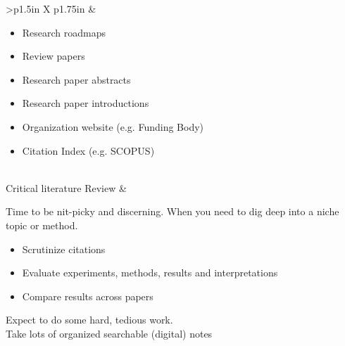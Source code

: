 \documentclass[8pt]{extarticle}
\begin{document}
\begin{tabularx}{\linewidth}{>{\bfseries}p{1.5in} X p{1.75in}}
                                                            &   \begin{minipage}[t]{\linewidth}
                                                                \begin{itemize}[nosep,leftmargin=*]
                                                                    \item Research roadmaps
                                                                    \item Review papers
                                                                    \item Research paper abstracts
                                                                    \item Research paper introductions
                                                                \end{itemize}
                                                                \vspace{1em}
                                                                \begin{itemize}[nosep,leftmargin=*]
                                                                    \item Organization website (e.g. Funding Body)
                                                                    \item Citation Index (e.g. SCOPUS)
                                                                \end{itemize}
                                                                \end{minipage}
                                                                        \\
    \addlinespace
    Critical literature Review  &   \begin{minipage}[t]{\linewidth}
                                    Time to be nit-picky and discerning.
                                    When you need to dig deep into a niche topic or method.
                                    \begin{itemize}[nosep]
                                        \item Scrutinize citations
                                        \item Evaluate experiments, methods, results and interpretations
                                        \item Compare results across papers
                                    \end{itemize}
                                    Expect to do some hard, tedious work. \\
                                    Take lots of organized searchable (digital) notes
                                    \end{minipage}


\end{tabularx}
\end{document}
